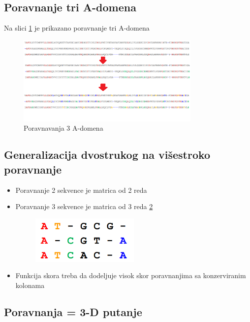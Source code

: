 \subsection{Poravnanje tri A-domena}
Na slici \ref{slika:poravnavanjaTriA} je prikazano poravnanje tri A-domena
\begin{figure}[]
\centering
\includegraphics[width=0.8\textwidth]{poglavlja/5/slike/poravnavanjaTriAdomena.png}
\caption{Poravnavanja 3 A-domena}
\label{slika:poravnavanjaTriA}
\end{figure}

\subsection{Generalizacija dvostrukog na višestroko poravnanje}

\begin{itemize}
    \item Poravnanje 2 sekvence je matrica od 2 reda
    \item Poravnanje 3 sekvence je matrica od 3 reda \ref{slika:poravnavanjeMatrica}
    \begin{figure}[]
    \centering
    \includegraphics[width=0.5\textwidth]{poglavlja/5/slike/poravnanjeMatrica.png}
    \label{slika:poravnavanjeMatrica}
    \end{figure}
    \item Funkcija skora treba da dodeljuje visok skor poravnanjima sa konzerviranim kolonama
\end{itemize}

\subsection{Poravnanja = 3-D putanje}

